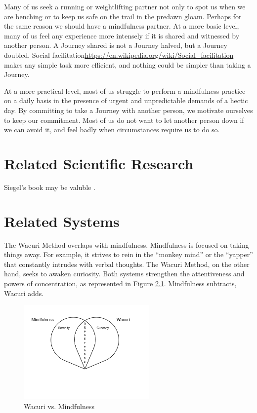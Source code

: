 \documentclass[12pt]{book}
\begin{document}
Many of us seek a running or weightlifting partner not only to spot
us when we are benching or to keep us safe on the trail in the
predawn gloam.  Perhaps for the same reason we should have a
mindfulness partner.  At a more basic level, many of us feel any
experience more intensely if it is shared and witnessed by another
person. A Journey shared is not a Journey halved, but a Journey
doubled.  Social facilitation\url{https://en.wikipedia.org/wiki/Social_facilitation} makes any simple task more efficient, and
nothing could be simpler than taking a Journey.

At a more practical level, most of us struggle to perform a
mindfulness practice on a daily basis in the presence of urgent and
unpredictable demands of a hectic day.  By committing to take a Journey
with another person, we motivate ourselves to keep our commitment. Most
of us do not want to let another person down if we can avoid it, and
feel badly when circumstances require us to do so.

\chapter{Related Scientific Research}

Siegel's book may be valuble \cite{siegel2007mindful}.


\chapter{Related Systems}

The Wacuri Method overlaps with mindfulness.  Mindfulness is focused
on taking things away. For example, it strives to rein in the
``monkey mind'' or the ``yapper'' that constantly intrudes with
verbal thoughts. The Wacuri Method, on the other hand, seeks
to awaken curiosity. Both systems strengthen the attentiveness
and powers of concentration, as represented in Figure \ref{fig:wacurivsmindfulness}. Mindfulness subtracts, Wacuri adds.

\begin{figure}
  \centering
     \includegraphics[width=0.6\textwidth]{WacuriFigures/WacuriMindfulnessDiagram.png}
     \caption{Wacuri vs. Mindfulness}
  \label{fig:wacurivsmindfulness}     
\end{figure}
\end{document}
